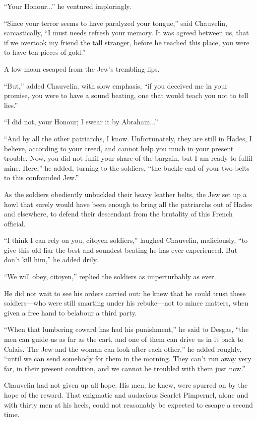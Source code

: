 \enquote{Your Honour...} he ventured imploringly.

\enquote{Since your terror seems to have paralyzed your tongue,} said Chauvelin, sarcastically, \enquote{I must needs refresh your memory. It was agreed between us, that if we overtook my friend the tall stranger, before he reached this place, you were to have ten pieces of gold.}

A low moan escaped from the Jew's trembling lips.

\enquote{But,} added Chauvelin, with slow emphasis, \enquote{if you deceived me in your promise, you were to have a sound beating, one that would teach you not to tell lies.}

\enquote{I did not, your Honour; I swear it by Abraham...}

\enquote{And by all the other patriarchs, I know. Unfortunately, they are still in Hades, I believe, according to your creed, and cannot help you much in your present trouble. Now, you did not fulfil your share of the bargain, but I am ready to fulfil mine. Here,} he added, turning to the soldiers, \enquote{the buckle-end of your two belts to this confounded Jew.}

As the soldiers obediently unbuckled their heavy leather belts, the Jew set up a howl that surely would have been enough to bring all the patriarchs out of Hades and elsewhere, to defend their descendant from the brutality of this French official.

\enquote{I think I can rely on you, citoyen soldiers,} laughed Chauvelin, maliciously, \enquote{to give this old liar the best and soundest beating he has ever experienced. But don't kill him,} he added drily.

\enquote{We will obey, citoyen,} replied the soldiers as imperturbably as ever.

He did not wait to see his orders carried out: he knew that he could trust these soldiers---who were still smarting under his rebuke---not to mince matters, when given a free hand to belabour a third party.

\enquote{When that lumbering coward has had his punishment,} he said to Desgas, \enquote{the men can guide us as far as the cart, and one of them can drive us in it back to Calais. The Jew and the woman can look after each other,} he added roughly, \enquote{until we can send somebody for them in the morning. They can't run away very far, in their present condition, and we cannot be troubled with them just now.}

Chauvelin had not given up all hope. His men, he knew, were spurred on by the hope of the reward. That enigmatic and audacious Scarlet Pimpernel, alone and with thirty men at his heels, could not reasonably be expected to escape a second time.

